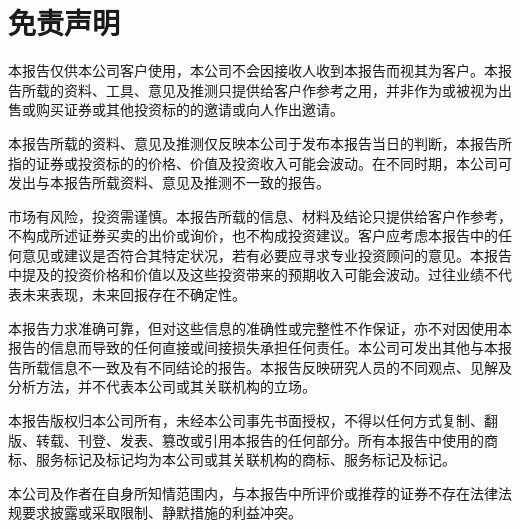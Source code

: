 \documentclass[a4paper,11pt,openany,fontset=none]{ctexrep}
\begin{document}
\astockcover

\tableofcontents
\clearpage














\chapter*{免责声明}

\begin{disclosurebox}[免责声明]
\small
本报告仅供本公司客户使用，本公司不会因接收人收到本报告而视其为客户。本报告所载的资料、工具、意见及推测只提供给客户作参考之用，并非作为或被视为出售或购买证券或其他投资标的的邀请或向人作出邀请。

本报告所载的资料、意见及推测仅反映本公司于发布本报告当日的判断，本报告所指的证券或投资标的的价格、价值及投资收入可能会波动。在不同时期，本公司可发出与本报告所载资料、意见及推测不一致的报告。

市场有风险，投资需谨慎。本报告所载的信息、材料及结论只提供给客户作参考，不构成所述证券买卖的出价或询价，也不构成投资建议。客户应考虑本报告中的任何意见或建议是否符合其特定状况，若有必要应寻求专业投资顾问的意见。本报告中提及的投资价格和价值以及这些投资带来的预期收入可能会波动。过往业绩不代表未来表现，未来回报存在不确定性。

本报告力求准确可靠，但对这些信息的准确性或完整性不作保证，亦不对因使用本报告的信息而导致的任何直接或间接损失承担任何责任。本公司可发出其他与本报告所载信息不一致及有不同结论的报告。本报告反映研究人员的不同观点、见解及分析方法，并不代表本公司或其关联机构的立场。

本报告版权归本公司所有，未经本公司事先书面授权，不得以任何方式复制、翻版、转载、刊登、发表、篡改或引用本报告的任何部分。所有本报告中使用的商标、服务标记及标记均为本公司或其关联机构的商标、服务标记及标记。

本公司及作者在自身所知情范围内，与本报告中所评价或推荐的证券不存在法律法规要求披露或采取限制、静默措施的利益冲突。
\end{disclosurebox}
\end{document}

